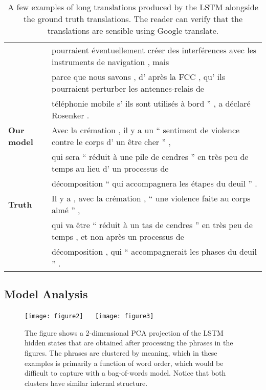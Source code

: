 \documentclass{article} \usepackage{nips14submit_e}
\begin{document}
\begin{table}[ht!]
\begin{footnotesize}
\begin{tabular}{|l|l|}
& pourraient \'{e}ventuellement cr\'{e}er des interf\'{e}rences avec les instruments de navigation , mais \\
& parce que nous savons , d' apr\`{e}s la FCC , qu' ils pourraient perturber les antennes-relais de \\
& t\'{e}l\'{e}phonie mobile s' ils sont utilis\'{e}s \`{a} bord '' , a d\'{e}clar\'{e} Rosenker .\\
\hline\hline
{\bf Our model} & 
Avec la cr\'{e}mation , il y a un `` sentiment de violence contre le corps d' un \^{e}tre cher '' , \\
& qui sera `` r\'{e}duit \`{a} une pile de cendres '' en tr\`{e}s peu de temps au lieu d' un processus de \\
& d\'{e}composition ``  qui accompagnera les \'{e}tapes du deuil '' .\\
\hline
{\bf Truth} & 
Il y a , avec la cr\'{e}mation , `` une violence faite au corps aim\'{e} '' , \\
& qui va \^{e}tre `` r\'{e}duit \`{a} un tas de cendres '' en tr\`{e}s peu de temps , et non apr\`{e}s un processus de \\
&d\'{e}composition , qui `` accompagnerait les phases du deuil '' .\\
\hline
\end{tabular}
\end{footnotesize}
\caption{A few examples of long translations produced by the LSTM
  alongside the ground truth translations.  The reader can verify that
  the translations are sensible using Google translate.  }
\label{tab:examples}
\end{table}






\subsection{Model Analysis}

\begin{figure}[h!]
\centering
\texttt{[image: figure2]} ~~
\texttt{[image: figure3]} 
\caption{\small The figure shows a 2-dimensional PCA projection of the
  LSTM hidden states that are obtained after processing the phrases in
  the figures.  The phrases are clustered by meaning, which in these
  examples is primarily a function of word order, which would be
  difficult to capture with a bag-of-words model. Notice that both
  clusters have similar internal structure.}
\label{fig:embedding}
\end{figure}
\end{document}
